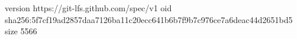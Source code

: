 version https://git-lfs.github.com/spec/v1
oid sha256:5f7cf19ad2857daa7126ba11c20ecc641b6b7f9b7c976ce7a6deac44d2651bd5
size 5566

